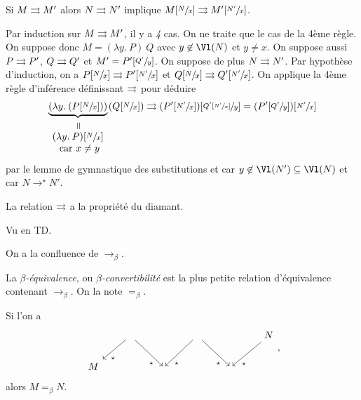 \documentclass[./main]{subfiles}
\begin{document}
  \begin{lem}
    Si $M \rightrightarrows M'$ alors  $N \rightrightarrows N'$ implique  $M[\sfrac{N}{x}] \rightrightarrows M'[\sfrac{N'}{x}]$.
  \end{lem}
  \begin{prv}
    Par induction sur $M \rightrightarrows M'$, il y a  \textit{4} cas.
    On ne traite que le cas de la 4ème règle.
    On suppose donc $M = (\lambda y.\: P)\: Q$ avec $y \not\in \Vl(N)$ et $y \neq x$.
    On suppose aussi $P \rightrightarrows P'$,  $Q \rightrightarrows Q'$ et $M' = P'[\sfrac{Q'}{y}]$.
    On suppose de plus $N \rightrightarrows N'$.
    Par hypothèse d'induction, on a $P[\sfrac{N}{x}] \rightrightarrows P'[\sfrac{N'}{x}]$ et $Q[\sfrac{N}{x}] \rightrightarrows Q'[\sfrac{N'}{x}]$.
    On applique la 4ème règle d'inférence définissant $\rightrightarrows$ pour déduire 
     \[
       \underbrace{(\lambda y. \: (P[\sfrac{N}{x}]))}_{
         \begin{array}{c}
           \vertical = \\
            (\lambda y.\: P)[\sfrac{N}{x}]\\
            \text{ car } x  \neq y
         \end{array}
       } (Q[\sfrac{N}{x}]) \rpar 
       (P'[\sfrac{N'}{x}])[\sfrac{Q'[\sfrac{N'}{x}]}{y}] = (P'[\sfrac{Q'}{y}])[\sfrac{N'}{x}]
    \]
    par le lemme de gymnastique des substitutions et car $y \not\in  \Vl(N') \subseteq \Vl(N)$ et car $N \to^\star N'$.
  \end{prv}

  \begin{prop}
    La relation $\rightrightarrows$ a la propriété du diamant.
  \end{prop}
  \begin{prv}
    Vu en TD.
  \end{prv}

  \begin{crlr}
    On a la confluence de $\to_\beta$.
  \end{crlr}

  \begin{defn}
    La \textit{$\beta$-équivalence}, ou \textit{$\beta$-convertibilité} est la plus petite relation d'équivalence contenant $\to_\beta$.
    On la note $=_\beta$.

    Si l'on a \[
    \begin{tikzcd}
      & \arrow[near end]{dl}{\star} \arrow[swap,near end]{dr}{\star} & &  \arrow[near end]{dl}{\star} \arrow[swap,near end]{dr}{\star} & &  \arrow[near end]{dl}{\star} N \\
      M &  & ~ & & ~ &
    \end{tikzcd}
    ,\] 
    alors $M =_\beta N$.
  \end{defn}
\end{document}
